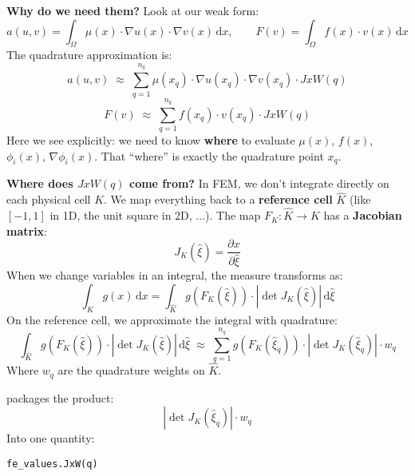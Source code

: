 \begin{itemize}
    \textcolor{Green3}{ \textbf{Why do we need them?}} Look at our weak form:
    \begin{equation*}
        a(u,v) = \int_{\Omega} \mu(x) \cdot \nabla u(x) \cdot \nabla v(x)\,\mathrm{d}x, \qquad F(v) = \int_{\Omega} f(x) \cdot v(x)\,\mathrm{d}x
    \end{equation*}
    The quadrature approximation is:
    \begin{equation*}
        a(u,v) \;\approx\; \sum_{q=1}^{n_q} \mu(x_q) \cdot \nabla u(x_q) \cdot \nabla v(x_q) \cdot JxW(q)
    \end{equation*}
    \begin{equation*}
        F(v) \;\approx\; \sum_{q=1}^{n_q} f(x_q) \cdot v(x_q) \cdot JxW(q)
    \end{equation*}
    Here we see explicitly: we need to know \textbf{where} to evaluate $\mu(x)$, $f(x)$, $\phi_{i}(x)$, $\nabla\phi_i(x)$. That ``where'' is exactly the quadrature point $x_q$.

    \textcolor{Green3}{ \textbf{Where does $JxW(q)$ come from?}} In FEM, we don't integrate directly on each physical cell $K$. We map everything back to a \textbf{reference cell} $\hat{K}$ (like $[-1,1]$ in 1D, the unit square in 2D, ...). The map $F_K : \hat{K} \to K$ has a \textbf{Jacobian matrix}:
    \begin{equation}
        J_{K}\left(\hat{\xi}\right) = \dfrac{\partial x}{\partial \hat{\xi}}
    \end{equation}
    When we change variables in an integral, the measure transforms as:
    \begin{equation*}
        \int_{K} g(x)\, \mathrm{d}x = \int_{\hat{K}} g\left(F_{K}\left(\hat{\xi}\right)\right) \cdot \left|\det J_{K}\left(\hat{\xi}\right)\right| \, \mathrm{d}\hat{\xi}
    \end{equation*}
    On the reference cell, we approximate the integral with quadrature:
    \begin{equation*}
        \int_{\hat{K}} g\left(F_{K}\left(\hat{\xi}\right)\right) \cdot \left|\det J_{K}\left(\hat{\xi}\right)\right| \, \mathrm{d}\hat{\xi}
        \;\approx\;
        \displaystyle\sum_{q=1}^{n_q} g\left(F_K\left(\hat{\xi}_q\right)\right) \cdot \left|\det J_K\left(\hat{\xi}_q\right)\right| \cdot w_{q}
    \end{equation*}
    Where $w_q$ are the quadrature weights on $\hat{K}$.

     packages the product:
    \begin{equation*}
        \left|\det J_K\left(\hat{\xi}_q\right)\right| \cdot w_q
    \end{equation*}
    Into one quantity:
    \begin{lstlisting}
fe_values.JxW(q)\end{lstlisting}


\end{itemize}
